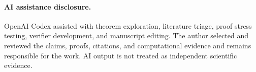 \documentclass[11pt,a4paper]{article}
\begin{document}
\paragraph{AI assistance disclosure.}
OpenAI Codex assisted with theorem exploration, literature triage, proof
stress testing, verifier development, and manuscript editing.  The author
selected and reviewed the claims, proofs, citations, and computational
evidence and remains responsible for the work.  AI output is not treated as
independent scientific evidence.

\begingroup
\fontsize{8.5}{10}\selectfont
\let\oldthebibliography\thebibliography
\renewcommand{\thebibliography}[1]{%
  \oldthebibliography{#1}\setlength{\itemsep}{0pt}}


\endgroup
\end{document}

